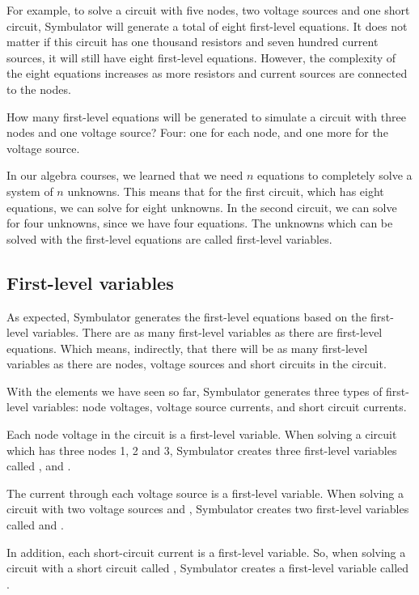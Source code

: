For example, to solve a circuit with five nodes, two voltage sources
and one short circuit, Symbulator will generate a total of eight
first-level equations. It does not matter if this circuit has one
thousand resistors and seven hundred current sources, it will still
have eight first-level equations. However, the complexity of the
eight equations increases as more resistors and current sources are
connected to the nodes.

How many first-level equations will be generated to simulate a
circuit with three nodes and one voltage source? Four: one for each
node, and one more for the voltage source.

In our algebra courses, we learned that we need $n$ equations to
completely solve a system of $n$ unknowns. This means that for the
first circuit, which has eight equations, we can solve for eight
unknowns. In the second circuit, we can solve for four unknowns,
since we have four equations. The unknowns which can be solved with
the first-level equations are called first-level variables.

\subsection{First-level variables}

As expected, Symbulator generates the first-level equations based on
the first-level variables. There are as many first-level variables
as there are first-level equations. Which means, indirectly, that
there will be as many first-level variables as there are nodes,
voltage sources and short circuits in the circuit.

With the elements we have seen so far, Symbulator generates three
types of first-level variables: node voltages, voltage source
currents, and short circuit currents.

Each node voltage in the circuit is a first-level variable. When
solving a circuit which has three nodes 1, 2 and 3, Symbulator
creates three first-level variables called ,  and
.

The current through each voltage source is a first-level variable.
When solving a circuit with two voltage sources  and
, Symbulator creates two first-level variables called
 and .

In addition, each short-circuit current is a first-level variable.
So, when solving a circuit with a short circuit called ,
Symbulator creates a first-level variable called .

